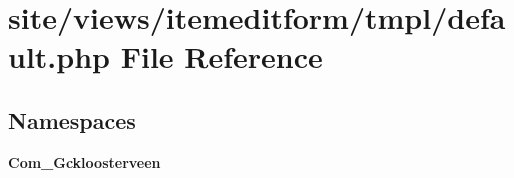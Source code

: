 \section{site/views/itemeditform/tmpl/default.php File Reference}
\label{site_2views_2itemeditform_2tmpl_2default_8php}
\subsection*{Namespaces}
\begin{DoxyCompactItemize}
\item 
 \textbf{ Com\+\_\+\+Gckloosterveen}
\end{DoxyCompactItemize}
